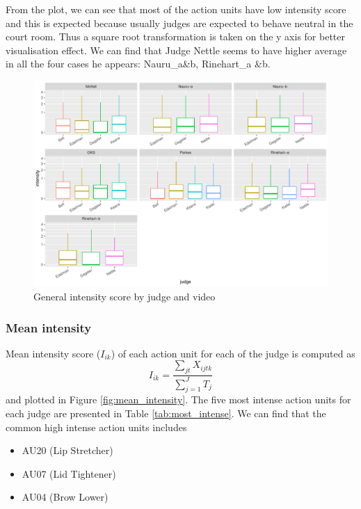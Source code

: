 \documentclass{monashthesis}
\begin{document}
From the plot, we can see that most of the action units have low intensity score and this is expected because usually judges are expected to behave neutral in the court room. Thus a square root transformation is taken on the y axis for better visualisation effect. We can find that Judge Nettle seems to have higher average in all the four cases he appears: Nauru\_a\&b, Rinehart\_a \&b.

\begin{figure}

{\centering \includegraphics[width=1\linewidth]{figures/intensity-boxplot-1} 

}

\caption{General intensity score by judge and video\label{fig:intensity}}\label{fig:intensity-boxplot}
\end{figure}

\hypertarget{mean-intensity}{%
\subsubsection{Mean intensity}\label{mean-intensity}}

Mean intensity score (\(I_{ik}\)) of each action unit for each of the judge is computed as \[I_{ik} = \frac{\sum_{jt}X_{ijtk}}{\sum_{j = 1}^JT_j}\] and plotted in Figure \ref{fig:mean_intensity}. The five most intense action units for each judge are presented in Table \ref{tab:most_intense}. We can find that the common high intense action units includes

\begin{itemize}
\tightlist
\item
  AU20 (Lip Stretcher)
\item
  AU07 (Lid Tightener)
\item
  AU04 (Brow Lower)
\end{itemize}
\end{document}

